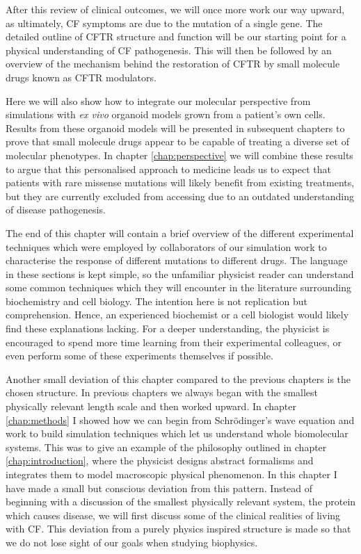 After this review of clinical outcomes, we will once more work our way upward, as ultimately, CF symptoms are due to the mutation of a single gene. The detailed outline of CFTR structure and function will be our starting point for a physical understanding of CF pathogenesis. This will then be followed by an overview of the mechanism behind the restoration of CFTR by small molecule drugs known as CFTR modulators. 

Here we will also show how to integrate our molecular perspective from simulations with \textit {ex vivo} organoid models grown from a patient's own cells. Results from these organoid models will be presented in subsequent chapters to prove that small molecule drugs appear to be capable of treating a diverse set of molecular phenotypes. In chapter \ref{chap:perspective} we will combine these results to argue that this personalised approach to medicine leads us to expect that patients with rare missense mutations will likely benefit from existing treatments, but they are currently excluded from accessing due to an outdated understanding of disease pathogenesis. 

The end of this chapter will contain a brief overview of the different experimental techniques which were employed by collaborators of our simulation work to characterise the response of different mutations to different drugs. The language in these sections is kept simple, so the unfamiliar physicist reader can understand some common techniques which they will encounter in the literature surrounding biochemistry and cell biology. The intention here is not replication but comprehension. Hence, an experienced biochemist or a cell biologist would likely find these explanations lacking. For a deeper understanding, the physicist is encouraged to spend more time learning from their experimental colleagues, or even perform some of these experiments themselves if possible. 

Another small deviation of this chapter compared to the previous chapters is the chosen structure. In previous chapters we always began with the smallest physically relevant length scale and then worked upward. In chapter \ref{chap:methods} I showed how we can begin from Schr\"odinger's wave equation and work to build simulation techniques which let us understand whole biomolecular systems. This was to give an example of the philosophy outlined in chapter \ref{chap:introduction}, where the physicist designs abstract formalisms and integrates them to model macroscopic physical phenomenon. In this chapter I have made a small but conscious deviation from this pattern. Instead of beginning with a discussion of the smallest physically relevant system, the protein which causes disease, we will first discuss some of the clinical realities of living with CF. This deviation from a purely physics inspired structure is made so that we do not lose sight of our goals when studying biophysics.

